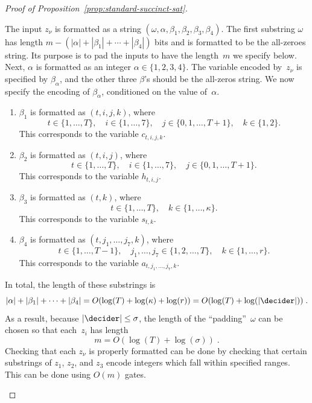 \begin{proof}[Proof of Proposition~\ref{prop:standard-succinct-sat}]
\begin{definition}
  The input $z_\nu$ is formatted as a string $(\omega, \alpha, \beta_1, \beta_2,
  \beta_3, \beta_4)$.
	The first substring $\omega$ has length $m - (|\alpha| + |\beta_1| + \cdots +
  |\beta_4|)$ bits and is formatted to be the all-zeroes string.
	Its purpose is to pad the inputs to have the length~$m$ we specify below.
	Next, $\alpha$ is formatted as an integer $\alpha \in \{1,2, 3, 4\}$.
	The variable encoded by~$z_\nu$ is specified by $\beta_\alpha$, and the other
  three $\beta$'s should be the all-zeros string.
	We now specify the encoding of $\beta_\alpha$, conditioned on the value
  of~$\alpha$.
	\begin{enumerate}
	\item $\beta_1$ is formatted as $(t, i, j, k)$, where\label{item:a=1}
		\begin{equation*}
      t \in \{1, \ldots, T\}, \quad i \in \{1, \ldots, 7\},
      \quad j \in \{0, 1, \ldots, T+1\}, \quad k \in \{1, 2\}.
		\end{equation*}
		This corresponds to the variable $c_{t, i, j, k}$.
	\item $\beta_2$ is formatted as $(t, i, j)$, where\label{item:a=2}
		\begin{equation*}
      t \in \{1, \ldots, T\}, \quad i \in \{1, \ldots, 7\},
      \quad j \in \{0, 1, \ldots, T+1\}.
		\end{equation*}
		This corresponds to the variable $h_{t, i, j}$.
	\item $\beta_3$ is formatted as $(t, k)$, where\label{item:a=3}
		\begin{equation*}
      t \in \{1, \ldots, T\}, \quad k \in \{1, \ldots, \kappa\}.
		\end{equation*}
		This corresponds to the variable $s_{t, k}$.
	\item $\beta_4$ is formatted as $(t, j_1, \ldots, j_7, k)$, where\label{item:a=4}
		\begin{equation*}
      t \in \{1, \ldots, T-1\}, \quad j_1, \ldots, j_7 \in \{1, 2, \ldots, T\},
      \quad k \in \{1, \ldots, r\}.
		\end{equation*}
		This corresponds to the variable $a_{t, j_1, \ldots, j_7, k}$.
	\end{enumerate}
	In total, the length of these substrings is
	\begin{equation*}
    |\alpha| + |\beta_1| + \cdots + |\beta_4| = O(\log(T) + \log(\kappa) +
    \log(r)) = O(\log(T) + \log(|\decider|))\;.
	\end{equation*}
	As a result, because $|\decider| \leq \sigma$, the length of the
  ``padding''~$\omega$ can be chosen so that each~$z_i$ has length
	\begin{equation}\label{eq:length-of-m}
    m = O(\log(T) + \log(\sigma))\;.
	\end{equation}
	Checking that each $z_\nu$ is properly formatted can be done by checking that
  certain substrings of $z_1$, $z_2$, and $z_3$ encode integers which fall
  within specified ranges.
	This can be done using $O(m)$ gates.


\end{definition}
\end{proof}
